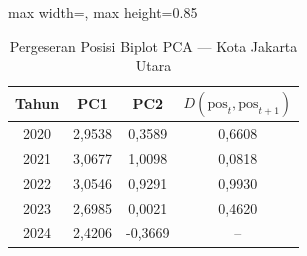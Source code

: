 \begin{table}[H]
\centering
\caption{Pergeseran Posisi Biplot PCA --- Kota Jakarta Utara} \label{tab:appjarak_pca_skor_kota_jakarta_utara}
\begin{adjustbox}{max width=\textwidth, max height=0.85\textheight}
\begin{tabular}{|c|c|c|c|}
\hline
\textbf{Tahun} & \textbf{PC1} & \textbf{PC2} & \textbf{$D(\text{pos}_t, \text{pos}_{t+1})$} \\
\hline
2020 & 2,9538 & 0,3589 & 0,6608 \\
2021 & 3,0677 & 1,0098 & 0,0818 \\
2022 & 3,0546 & 0,9291 & 0,9930 \\
2023 & 2,6985 & 0,0021 & 0,4620 \\
2024 & 2,4206 & -0,3669 & -- \\
\hline
\end{tabular}
\end{adjustbox}
\end{table}